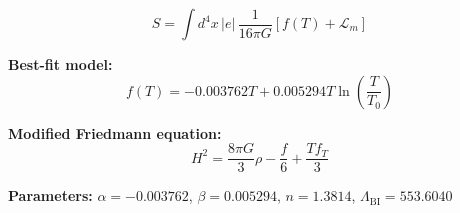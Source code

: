 
\begin{equation}
  S = \int d^4x \, |e| \, \frac{1}{16\pi G} \left[ f(T) + \mathcal{L}_m \right]
\end{equation}

\textbf{Best-fit model:}
\begin{equation}
  f(T) = -0.003762 T + 0.005294 T \ln\!\left(\frac{T}{T_0}\right)
\end{equation}

\textbf{Modified Friedmann equation:}
\begin{equation}
  H^2 = \frac{8\pi G}{3} \rho - \frac{f}{6} + \frac{T f_T}{3}
\end{equation}

\textbf{Parameters:}
$\alpha = -0.003762$, \quad
$\beta = 0.005294$, \quad
$n = 1.3814$, \quad
$\Lambda_{\text{BI}} = 553.6040$